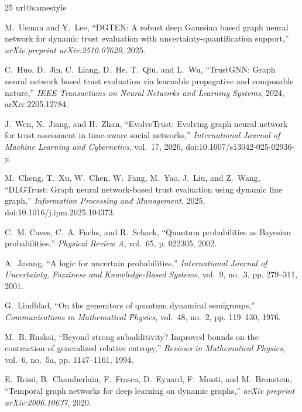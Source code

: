 \documentclass[journal]{IEEEtran}
\begin{document}
\begin{thebibliography}{25}
\linespread{0.91}\selectfont
\providecommand{\url}[1]{#1}
\csname url@samestyle\endcsname
\providecommand{\newblock}{\relax}
\providecommand{\bibinfo}[2]{#2}
\providecommand{\BIBdecl}{\relax}
\BIBdecl

M.~Usman and Y.~Lee, ``{DGTEN}: A robust deep {G}aussian based graph neural
  network for dynamic trust evaluation with uncertainty-quantification
  support,'' \emph{arXiv preprint arXiv:2510.07620}, 2025.

C.~Huo, D.~Jin, C.~Liang, D.~He, T.~Qiu, and L.~Wu, ``{TrustGNN}: Graph neural
  network based trust evaluation via learnable propagative and composable
  nature,'' \emph{IEEE Transactions on Neural Networks and Learning Systems}, 2024,
  arXiv:2205.12784.

J.~Wen, N.~Jiang, and H.~Zhan, ``{EvolveTrust}: Evolving graph neural network
  for trust assessment in time-aware social networks,'' \emph{International Journal of Machine Learning and Cybernetics}, vol.~17, 2026, doi:10.1007/s13042-025-02936-y.

M.~Cheng, T.~Xu, W.~Chen, W.~Fang, M.~Yao, J.~Liu, and Z.~Wang, ``{DLGTrust}:
  Graph neural network-based trust evaluation using dynamic line graph,''
  \emph{Information Processing and Management}, 2025, doi:10.1016/j.ipm.2025.104373.

C.~M. Caves, C.~A. Fuchs, and R.~Schack, ``Quantum probabilities as {B}ayesian
  probabilities,'' \emph{Physical Review A}, vol.~65, p. 022305, 2002.

A.~J{\o}sang, ``A logic for uncertain probabilities,'' \emph{International Journal of Uncertainty, Fuzziness and Knowledge-Based Systems}, vol.~9, no.~3, pp. 279--311, 2001.

G.~Lindblad, ``On the generators of quantum dynamical semigroups,''
  \emph{Communications in Mathematical Physics}, vol.~48, no.~2, pp. 119--130, 1976.

M.~B. Ruskai, ``Beyond strong subadditivity? {I}mproved bounds on the
  contraction of generalized relative entropy,'' \emph{Reviews in Mathematical Physics},
  vol.~6, no.~5a, pp. 1147--1161, 1994.

E.~Rossi, B.~Chamberlain, F.~Frasca, D.~Eynard, F.~Monti, and M.~Bronstein,
  ``Temporal graph networks for deep learning on dynamic graphs,'' \emph{arXiv
  preprint arXiv:2006.10637}, 2020.


\end{thebibliography}
\end{document}
